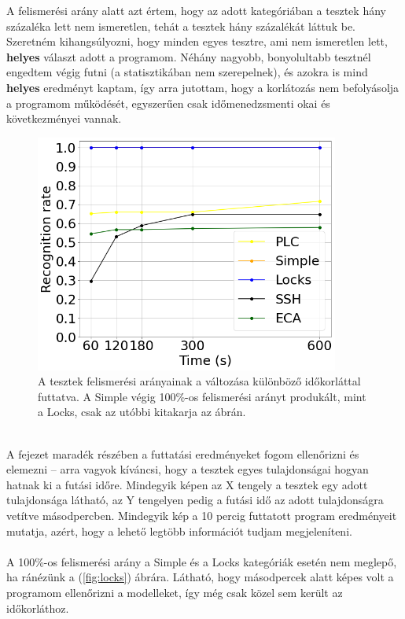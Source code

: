 A felismerési arány alatt azt értem, hogy az adott kategóriában a tesztek hány százaléka lett nem ismeretlen, tehát a tesztek hány százalékát láttuk be. Szeretném kihangsúlyozni, hogy minden egyes tesztre, ami nem ismeretlen lett, \textbf{helyes} választ adott a programom. Néhány nagyobb, bonyolultabb tesztnél engedtem végig futni (a statisztikában nem szerepelnek), és azokra is mind \textbf{helyes} eredményt kaptam, így arra jutottam, hogy a korlátozás nem befolyásolja a programom működését, egyszerűen csak időmenedzsmenti okai és következményei vannak.
\\
\begin{figure}[!ht]
	\centering
	\includegraphics[width=100mm, keepaspectratio]{figures/fig_rec_rate_during_time.png}
	\caption[Caption for LOF]{A tesztek felismerési arányainak a változása különböző időkorláttal futtatva. A Simple végig 100\%-os felismerési arányt produkált, mint a Locks, csak az utóbbi kitakarja az ábrán.}
	\label{fig:rec_rate_during_time}
\end{figure}
\ \\
A fejezet maradék részében a futtatási eredményeket fogom ellenőrizni és elemezni -- arra vagyok kíváncsi, hogy a tesztek egyes tulajdonságai hogyan hatnak ki a futási időre. Mindegyik képen az X tengely a tesztek egy adott tulajdonsága látható, az Y tengelyen pedig a futási idő az adott tulajdonságra vetítve másodpercben. Mindegyik kép a 10 percig futtatott program eredményeit mutatja, azért, hogy a lehető legtöbb információt tudjam megjeleníteni.
\\
\\
A 100\%-os felismerési arány a Simple és a Locks kategóriák esetén nem meglepő, ha ránézünk a (\ref{fig:locks}) ábrára. Látható, hogy másodpercek alatt képes volt a programom ellenőrizni a modelleket, így még csak közel sem került az időkorláthoz.

